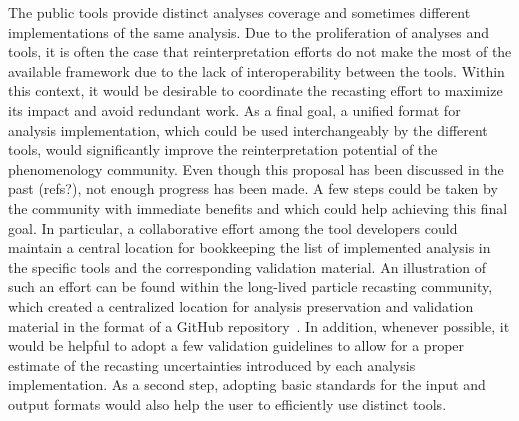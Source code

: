 \documentclass[11pt]{article}
\begin{document}
The public tools provide distinct analyses coverage and sometimes different implementations of the same analysis.
Due to the proliferation of analyses and tools, it is often the case that reinterpretation efforts do not make the most of the available framework due to the lack of interoperability between the tools.
Within this context, it would be desirable to coordinate the recasting effort to maximize its impact and avoid redundant work. 
As a final goal, a unified format for analysis implementation, which could be used interchangeably by the different tools, would significantly improve the reinterpretation potential of the phenomenology community.
Even though this proposal has been discussed in the past (refs?), not enough progress has been made.
A few steps could be taken by the community with immediate benefits and which could help achieving this final goal.
In particular, a collaborative effort among the tool developers could maintain a central location for bookkeeping the list of implemented analysis in the specific tools and the corresponding validation material.
An illustration of such an effort can be found within the 
long-lived particle recasting community, which created a centralized location for analysis preservation and validation material in the format of a GitHub repository~\cite{llpRepo}.
In addition, whenever possible, it would be helpful to adopt a few validation guidelines to allow for a proper estimate of the recasting uncertainties introduced by each analysis implementation.
As a second step, adopting basic standards for the input and output formats would also help the user to efficiently use distinct tools.
\end{document}

